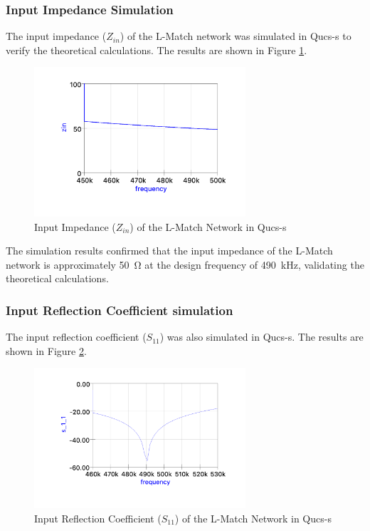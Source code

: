 \subsubsection{Input Impedance Simulation}
The input impedance ($Z_{in}$) of the L-Match network was simulated in Qucs-s to verify the theoretical calculations. The results are shown in Figure \ref{fig:qucs_zin}.

\begin{figure}[H]
    \centering
    \includegraphics[width=0.7\textwidth]{Images/Qucs_Zin.png}
    \caption{Input Impedance ($Z_{in}$) of the L-Match Network in Qucs-s}
    \label{fig:qucs_zin}
\end{figure}

The simulation results confirmed that the input impedance of the L-Match network is approximately \SI{50}{\ohm} at the design frequency of \SI{490}{\kilo\hertz}, validating the theoretical calculations.

\subsubsection{Input Reflection Coefficient simulation}

The input reflection coefficient ($S_{11}$) was also simulated in Qucs-s. The results are shown in Figure \ref{fig:qucs_s11}.

\begin{figure}[H]
    \centering
    \includegraphics[width=0.7\textwidth]{Images/Qucs_S11.png}
    \caption{Input Reflection Coefficient ($S_{11}$) of the L-Match Network in Qucs-s}
    \label{fig:qucs_s11}
\end{figure}

